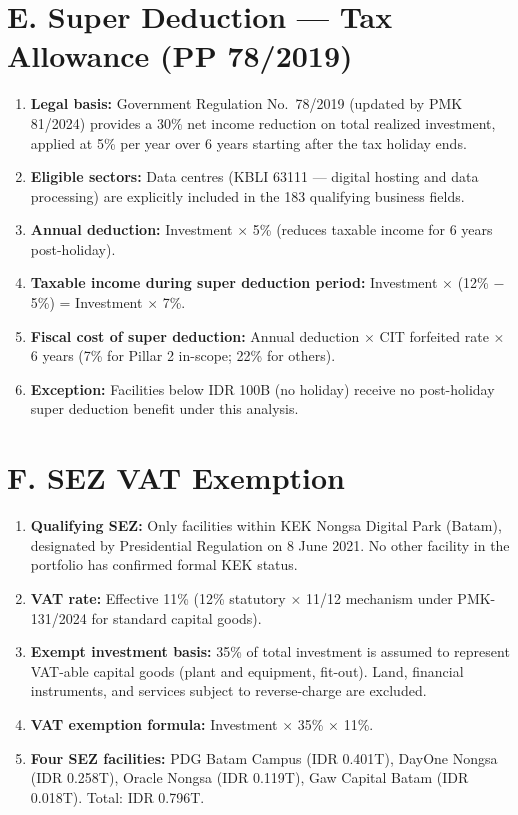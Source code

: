 \documentclass[a4paper,10pt]{article}
\begin{document}
\section{E. Super Deduction --- Tax Allowance (PP 78/2019)}
\begin{enumerate}[resume]
  \item \textbf{Legal basis:} Government Regulation No.\ 78/2019 (updated by PMK 81/2024) provides a 30\% net income reduction on total realized investment, applied at 5\% per year over 6 years starting after the tax holiday ends.
  \item \textbf{Eligible sectors:} Data centres (KBLI 63111 --- digital hosting and data processing) are explicitly included in the 183 qualifying business fields.
  \item \textbf{Annual deduction:} Investment $\times$ 5\% (reduces taxable income for 6 years post-holiday).
  \item \textbf{Taxable income during super deduction period:} Investment $\times$ (12\% $-$ 5\%) = Investment $\times$ 7\%.
  \item \textbf{Fiscal cost of super deduction:} Annual deduction $\times$ CIT forfeited rate $\times$ 6 years (7\% for Pillar 2 in-scope; 22\% for others).
  \item \textbf{Exception:} Facilities below IDR 100B (no holiday) receive no post-holiday super deduction benefit under this analysis.
\end{enumerate}

\section{F. SEZ VAT Exemption}
\begin{enumerate}[resume]
  \item \textbf{Qualifying SEZ:} Only facilities within KEK Nongsa Digital Park (Batam), designated by Presidential Regulation on 8 June 2021. No other facility in the portfolio has confirmed formal KEK status.
  \item \textbf{VAT rate:} Effective 11\% (12\% statutory $\times$ 11/12 mechanism under PMK-131/2024 for standard capital goods).
  \item \textbf{Exempt investment basis:} 35\% of total investment is assumed to represent VAT-able capital goods (plant and equipment, fit-out). Land, financial instruments, and services subject to reverse-charge are excluded.
  \item \textbf{VAT exemption formula:} Investment $\times$ 35\% $\times$ 11\%.
  \item \textbf{Four SEZ facilities:} PDG Batam Campus (IDR 0.401T), DayOne Nongsa (IDR 0.258T), Oracle Nongsa (IDR 0.119T), Gaw Capital Batam (IDR 0.018T). Total: IDR 0.796T.
\end{enumerate}
\end{document}
